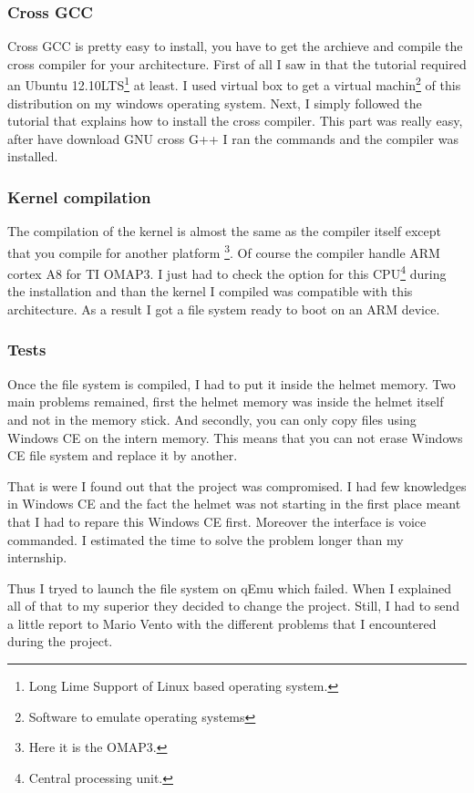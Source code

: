 	\subsubsection{Cross GCC}
	
	\par Cross GCC is pretty easy to install, you have to get the archieve and compile the cross compiler for your architecture. First of all I saw in that the tutorial required an Ubuntu 12.10LTS\footnote{Long Lime Support of Linux based operating system.} at least. I used virtual box to get a virtual machin\footnote{Software to emulate operating systems} of this distribution on my windows operating system. Next, I simply followed the tutorial that explains how to install the cross compiler. This part was really easy, after have download GNU cross G++ I ran the commands and the compiler was installed.
	
	\subsubsection{Kernel compilation}
	
	\par The compilation of the kernel is almost the same as the compiler itself except that you compile for another platform \footnote{Here it is the OMAP3.}. Of course the compiler handle ARM cortex A8 for TI OMAP3. I just had to check the option for this CPU\footnote{Central processing unit.} during the installation and than the kernel I compiled was compatible with this architecture. As a result I got a file system ready to boot on an ARM device.
	
	
	\subsubsection{Tests}
	
	\par Once the file system is compiled, I had to put it inside the helmet memory. Two main problems remained, first the helmet memory was inside the helmet itself and not in the memory stick. And secondly, you can only copy files using Windows CE on the intern memory. This means that you can not erase Windows CE file system and replace it by another.
	\par That is were I found out that the project was compromised. I had few knowledges in Windows CE and the fact the helmet was not starting in the first place meant that I had to repare this Windows CE first. Moreover the interface is voice commanded. I estimated the time to solve the problem longer than my internship.
	\par Thus I tryed to launch the file system on qEmu which failed. When I explained all of that to my superior they decided to change the project. Still, I had to send a little report to Mario Vento with the different problems that I encountered during the project.
	

